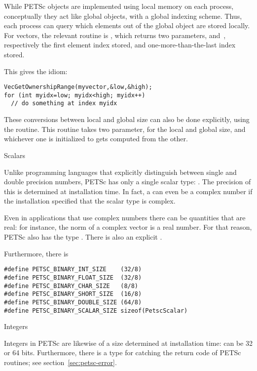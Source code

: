 
While PETSc objects are implemented using local memory on each
process, conceptually they act like global objects, with a global
indexing scheme. Thus, each process can query which elements out of
the global object are stored locally.
For vectors, the relevant routine is ,
which returns two parameters,  and~,
respectively the first element index stored, and
one-more-than-the-last index stored.

This gives the idiom:
\begin{lstlisting}
VecGetOwnershipRange(myvector,&low,&high);
for (int myidx=low; myidx<high; myidx++)
  // do something at index myidx
\end{lstlisting}

These conversions between local and global size can also be done
explicitly, using the  routine.
This routine takes two parameter, for the local and global size, and
whichever one is initialized to  gets
computed from the other.

 {Scalars}
\label{sec:petsc-scalar}

Unlike programming languages that explicitly distinguish between
single and double precision numbers, PETSc has only a single scalar
type: . The precision of this is determined
at installation time. In fact, a  can even be a
complex number if the installation specified that the scalar type is
complex.

Even in applications that use complex numbers there can be quantities
that are real: for instance, the norm of a complex vector is a real
number. For that reason, PETSc also has the type
. There is also an explicit .

Furthermore, there is
\begin{lstlisting}
#define PETSC_BINARY_INT_SIZE    (32/8)
#define PETSC_BINARY_FLOAT_SIZE  (32/8)
#define PETSC_BINARY_CHAR_SIZE   (8/8)
#define PETSC_BINARY_SHORT_SIZE  (16/8)
#define PETSC_BINARY_DOUBLE_SIZE (64/8)
#define PETSC_BINARY_SCALAR_SIZE sizeof(PetscScalar)  
\end{lstlisting}

 {Integers}

Integers in PETSc are likewise of a size determined at installation
time:  can be 32 or 64 bits. Furthermore,
there is a  type for catching the return
code of PETSc routines; see section~\ref{sec:petsc-error}.

